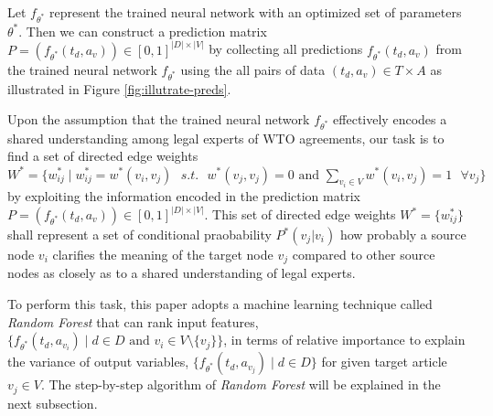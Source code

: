 Let $f_{\theta^*}$ represent the trained neural network with an optimized set of parameters $\theta^*$. 
Then we can construct a prediction matrix $P = (f_{\theta^*}(t_d, a_v)) \in [0,1]^{{|D| \times |V|}}$  by collecting all predictions $f_{\theta^*}(t_d, a_v)$ from the trained neural network $f_{\theta^{*}}$ using the all pairs of data $(t_d,a_v) \in T \times A$ as illustrated in Figure \ref{fig:illutrate-preds}.

Upon the assumption that the trained neural network $f_{\theta^*}$ effectively encodes a shared understanding among legal experts of WTO agreements, our task is to find a set of directed edge weights $W^* = \{w^{*}_{ij} \mid w^{*}_{ij} = w^{*}(v_i, v_j) \text{ } s.t. \text{ } w^{*}(v_j, v_j) = 0 \text{ and } \sum_{v_i\in V}{w^{*}(v_i, v_j)} = 1 \text{ } \forall v_j \}$ %
by exploiting the information encoded in the prediction matrix $P = (f_{\theta^*}(t_d, a_v)) \in [0,1]^{{|D| \times |V|}}$. This set of directed edge weights $W^{*} = \{w^{*}_{ij}\}$ shall represent a set of conditional praobability $P^{*}(v_j|v_i)$ how probably a source node $v_i$ clarifies the meaning of the target node $v_j$ compared to other source nodes
as closely as to a shared understanding of legal experts. %

To perform this task, this paper adopts a machine learning technique called \textit{Random Forest} that can rank input features, $\{f_{\theta^*}(t_d, a_{v_i}) \mid d \in D \text{ and } v_i \in V \setminus \{v_j\}\}$,  in terms of relative importance to explain the variance of output variables, $\{f_{\theta^*}(t_d, a_{v_j}) \mid d \in D \}$ for given target article $v_j \in V$. The step-by-step algorithm of \textit{Random Forest} will be explained in the next subsection.



